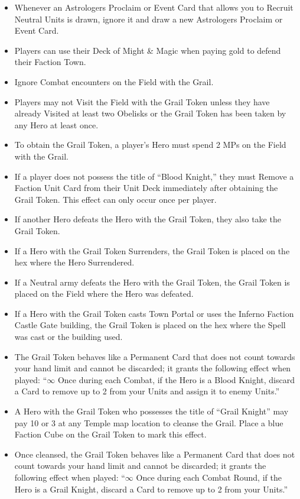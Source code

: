 \begin{multicols*}{2}
\begin{itemize}
  \item Whenever an Astrologers Proclaim or Event Card that allows you to Recruit Neutral Units is drawn, ignore it and draw a new Astrologers Proclaim or Event Card.
  \item Players can use their Deck of Might \& Magic when paying gold to defend their Faction Town.
  \item Ignore Combat encounters on the Field with the Grail.
  \item Players may not Visit the Field with the Grail Token unless they have already Visited at least two Obelisks or the Grail Token has been taken by any Hero at least once.
  \item To obtain the Grail Token, a player’s Hero must spend 2 MPs on the Field with the Grail.
  \item If a player does not possess the title of ``\textcolor{darkcandyapplered}{Blood Knight},'' they must Remove a Faction Unit Card from their Unit Deck immediately after obtaining the Grail Token. This effect can only occur once per player.
  \item If another Hero defeats the Hero with the Grail Token, they also take the Grail Token.
  \item If a Hero with the Grail Token Surrenders, the Grail Token is placed on the hex where the Hero Surrendered.
  \item If a Neutral army defeats the Hero with the Grail Token, the Grail Token is placed on the Field where the Hero was defeated.
  \item If a Hero with the Grail Token casts Town Portal or uses the Inferno Faction Castle Gate building, the Grail Token is placed on the hex where the Spell was cast or the building used.
  \item The Grail Token behaves like a Permanent Card that does not count towards your hand limit and cannot be discarded; it grants the following effect when played: ``$\infty$ Once during each Combat, if the Hero is a \textcolor{darkcandyapplered}{Blood Knight}, discard a Card to remove up to 2  from your Units and assign it to enemy Units.''
  \item A Hero with the Grail Token who possesses the title of ``\textcolor{cobalt}{Grail Knight}'' may pay 10  or 3  at any Temple map location to cleanse the Grail. Place a blue Faction Cube on the Grail Token to mark this effect.
  \item Once cleansed, the Grail Token behaves like a Permanent Card that does not count towards your hand limit and cannot be discarded; it grants the following effect when played: ``$\infty$ Once during each Combat Round, if the Hero is a \textcolor{cobalt}{Grail Knight}, discard a Card to remove up to 2  from your Units.''
\end{itemize}


\end{multicols*}

